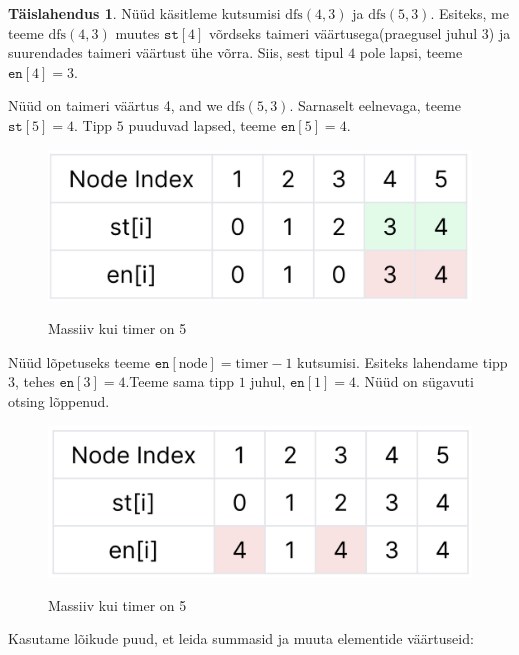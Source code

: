 \documentclass{trkut}
\theoremstyle{definition}
\newtheorem*{solution}{Täislahendus}
\begin{document}
\begin{solution}
Nüüd käsitleme kutsumisi $\text{dfs}(4, 3)$ ja $\text{dfs}(5, 3)$. 
Esiteks, me teeme $\text{dfs}(4, 3)$ muutes $\texttt{st}[4]$ võrdseks taimeri väärtusega(praegusel juhul 3) ja suurendades taimeri väärtust ühe võrra. 
Siis, sest tipul $4$ pole lapsi, teeme $\texttt{en}[4]=3$.

Nüüd on taimeri väärtus 4, and we $\text{dfs}(5, 3)$. Sarnaselt eelnevaga, teeme $\texttt{st}[5]=4$. 
Tipp $5$ puuduvad lapsed,
teeme $\texttt{en}[5]=4$.


\begin{figure}[H]%
    \includegraphics[width=12cm]{fifth.jpeg}%
    \caption{Massiiv kui timer on 5}%
    \label{joonis}%
\end{figure}
Nüüd lõpetuseks teeme $\texttt{en}[\text{node}] = \text{timer} - 1$
kutsumisi. Esiteks lahendame tipp $3$, tehes $\texttt{en}[3]=4$.Teeme sama tipp $1$ juhul, $\texttt{en}[1]=4$. 
Nüüd on sügavuti otsing lõppenud.
\begin{figure}[H]%
    \includegraphics[width=12cm]{sixth.jpeg}%
    \caption{Massiiv kui timer on 5}%
    \label{joonis}%
\end{figure}
\end{solution}
Kasutame lõikude puud, et leida summasid ja muuta elementide väärtuseid:
\end{document}
